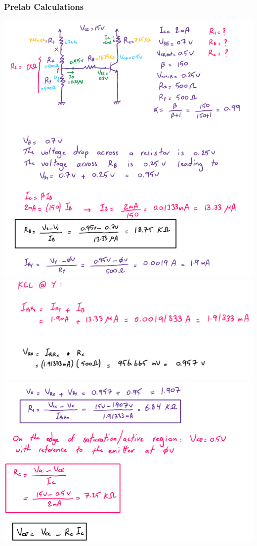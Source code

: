 \documentclass{article}
\begin{document}
	\subsubsection{Prelab Calculations}
	\includegraphics[width=\linewidth]{prelab1.png}
	\includegraphics[width=\linewidth]{prelab2.png}
	\includegraphics[width=\linewidth]{prelab3.png}
\end{document}

